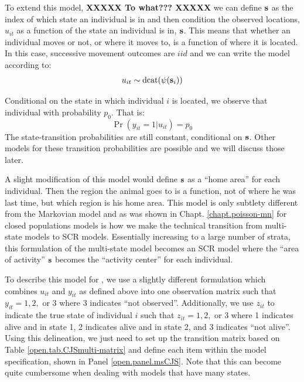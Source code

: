 To extend this model, {\bf XXXXX To what??? XXXXX}
we can define ${\bf s}$
as the index of which state
an individual is in and then condition the observed locations, $u_{it}$
as a function of the state an individual is in, ${\bf s}$. This
means that whether an individual moves or not, or where it moves to, is a function of where it is located.
In this case, 
successive movement outcomes 
are $iid$ and we can write the model according to:
\[
u_{it} \sim  \text{dcat}( {\psi}({\bf s}_{i}) )
\]

Conditional on the state in which individual $i$ is located, we
observe that individual with probability $p_{0}$. That is:
\[
 \Pr(y_{it} = 1| u_{it} )  = p_{0}
\]
The state-transition
probabilities are still constant, conditional on ${\bf s}$.
Other models for these transition probabilities
are possible and we will discuss those later.

A slight modification of this model would define ${\bf s}$  as a
``home area'' %
for each individual. Then the region the animal goes to is a function,
not of where he was last time, but which region is his home area.
This model is only subtlety different from the Markovian model and as
was shown in Chapt. \ref{chapt.poisson-mn} for closed populations
models is how we make the technical transition from multi-state models
to SCR models.  Essentially increasing to a large number of strata,
this formulation of the multi-state model becomes an SCR model where
the ``area of activity'' ${\bf s}$ becomes the ``activity center'' for
each individual.

To describe this model for \jags, we use a slightly different
formulation which combines $u_{it}$ and $y_{it}$ as
defined above into one observation matrix such that $y_{it} = 1, 2,$
or $3$ where 3 indicates ``not observed''.  Additionally, we use
$z_{it}$ to indicate the true state of individual $i$ such that
$z_{it} = 1, 2,$ or $3$ where 1 indicates alive and in state 1, 2
indicates alive and in state 2, and 3 indicates ``not alive''.  Using
this delineation, we just need to set up the transition matrix based
on Table \ref{open.tab.CJSmulti-matrix} and define each item within
the model specification, shown in Panel \ref{open.panel.msCJS}.  Note
that this can become quite cumbersome when dealing with models that
have many states.


